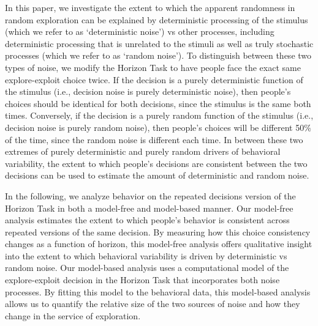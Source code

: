 \documentclass[12pt]{article}
\begin{document}
{	In this paper, we investigate the extent to which the apparent randomness in random exploration can be explained by deterministic processing of the stimulus (which we refer to as `deterministic noise') vs other processes, including deterministic processing that is unrelated to the stimuli as well as truly stochastic processes (which we refer to as `random noise'). To distinguish between these two types of noise, we modify the Horizon Task \citep{wilson2014} to have people face the exact same explore-exploit choice twice. If the decision is a purely deterministic function of the stimulus (i.e., decision noise is purely deterministic noise), then people's choices should be identical for both decisions, since the stimulus is the same both times. Conversely, if the decision is a purely random function of the stimulus (i.e., decision noise is purely random noise), then people's choices will be different 50$\%$ of the time, since the random noise is different each time. In between these two extremes of purely deterministic and purely random drivers of behavioral variability, the extent to which people's decisions are consistent between the two decisions can be used to estimate the amount of deterministic and random noise. 
	
	
	In the following, we analyze behavior on the repeated decisions version of the Horizon Task in both a model-free and model-based manner. Our model-free analysis estimates the extent to which people's behavior is consistent across repeated versions of the same decision. By measuring how this choice consistency changes as a function of horizon, this model-free analysis offers qualitative insight into the extent to which behavioral variability is driven by deterministic vs random noise. Our model-based analysis uses a computational model of the explore-exploit decision in the Horizon Task that incorporates both noise processes. By fitting this model to the behavioral data, this model-based analysis allows us to quantify the relative size of the two sources of noise and how they change in the service of exploration.
	
	
}
\end{document}
